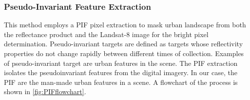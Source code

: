 \subsubsection{Pseudo-Invariant Feature Extraction}

This method employs a PIF pixel extraction \cite{Schott:1988} to mask urban landscape from both the reflectance product and the Landsat-8 image for the bright pixel determination. Pseudo-invariant targets are defined as targets whose reflectivity properties do not change rapidly between different times of collection. Examples of pseudo-invariant target are urban features in the scene.  The PIF extraction isolates the pseudoinvariant features from the digital imagery. In our case, the PIF are the man-made urban features in a scene. A flowchart of the process is shown in \autoref{fig:PIFflowchart}. 


